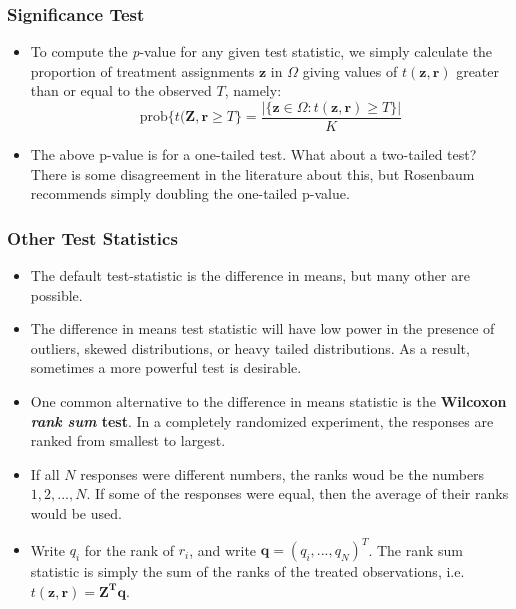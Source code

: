 \documentclass{beamer}
\begin{document}
\begin{frame}[c]\frametitle{Significance Test}
	\begin{itemize}
		\item<+-> To compute the \emph{p}-value for any given test statistic, we
		simply calculate the proportion of treatment assignments
		$\textbf{z}$
		in $\Omega$ giving values of $t(\mathbf{z},\mathbf{r})$ greater
		than or equal to the observed $T$, namely:
		$$ \textrm{prob}\{t(\mathbf{Z},\mathbf{r} \geq T\} =
		\frac{| \{\mathbf{z} \in\Omega:t(\mathbf{z},\mathbf{r}) \geq T \}
		  |}{K}$$
		  \item<+-> The above p-value is for a one-tailed test. What about a two-tailed
		test?  There is some disagreement in the literature about this, but
		Rosenbaum recommends simply doubling the one-tailed p-value.
			\end{itemize}	
\end{frame}
\begin{frame}[c]\frametitle{Other Test Statistics}
	\begin{itemize}
		\item<+-> The default test-statistic is the difference in means, but many other
		are possible. 
		\item<+-> The difference in means test statistic will have low
		power in the presence of outliers, skewed distributions, or heavy
		tailed distributions. As a result, sometimes a more powerful test is
		desirable.
		\item<+->  One common alternative to the difference in means statistic is the \textbf{Wilcoxon
				\textit{rank sum} test}. In a completely randomized experiment, the
		responses are ranked from smallest to largest.
		\item<+-> If all $N$ responses
		were different numbers, the ranks woud be the numbers $1,2,...,N$.  If
		some of the responses were equal, then the average of their ranks
		would be used.
		\item<+-> Write $q_i$ for the rank of $r_i$, and write
		$\mathbf{q}=(q_i,...,q_N)^T$. The rank sum statistic is simply the sum
		of the ranks of the treated observations,
		i.e. $t(\mathbf{z},\mathbf{r})=\mathbf{Z^Tq}$. 
	\end{itemize}
\end{frame}
\end{document}
